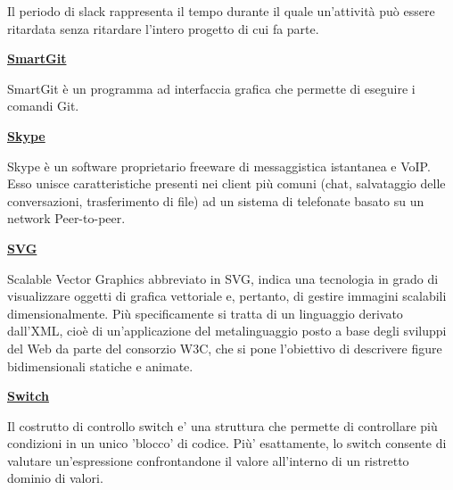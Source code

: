 \medskip
\begin{addmargin}[5em]{1em}	
Il periodo di slack rappresenta il tempo durante il quale un'attività può essere ritardata senza ritardare l'intero progetto di cui fa parte.
\end{addmargin}	

\bigskip
\begin{addmargin}[0em]{0em}		
	\textbf{\underline{SmartGit}}
\end{addmargin} 
	
\medskip
\begin{addmargin}[5em]{1em}	
SmartGit è un programma ad interfaccia grafica che permette di eseguire i comandi Git.	
\end{addmargin}	

\bigskip
\begin{addmargin}[0em]{0em}		
	\textbf{\underline{Skype}}
\end{addmargin}
	 
\medskip
\begin{addmargin}[5em]{1em}	
Skype è un software proprietario freeware di messaggistica istantanea e VoIP. Esso unisce caratteristiche presenti nei client più comuni (chat, salvataggio delle conversazioni, trasferimento di file) ad un sistema di telefonate basato su un network Peer-to-peer.  
\end{addmargin}	

\bigskip
\begin{addmargin}[0em]{0em}		
	\textbf{\underline{SVG}}
	\end{addmargin} 
	
\medskip
\begin{addmargin}[5em]{1em}	
Scalable Vector Graphics abbreviato in SVG, indica una tecnologia in grado di visualizzare oggetti di grafica vettoriale e, pertanto, di gestire immagini scalabili dimensionalmente.
Più specificamente si tratta di un linguaggio derivato dall'XML, cioè di un'applicazione del metalinguaggio posto a base degli sviluppi del Web da parte del consorzio W3C, che si pone l'obiettivo di descrivere figure bidimensionali statiche e animate.
\end{addmargin}	

\bigskip
\begin{addmargin}[0em]{0em}		
	\textbf{\underline{Switch}}
	\end{addmargin} 
	
\medskip
\begin{addmargin}[5em]{1em}	
Il costrutto di controllo switch e' una struttura che permette di controllare più condizioni in un unico 'blocco' di codice. Più' esattamente, lo switch consente di valutare un'espressione confrontandone il valore all'interno di un ristretto dominio di valori.
\end{addmargin}	

